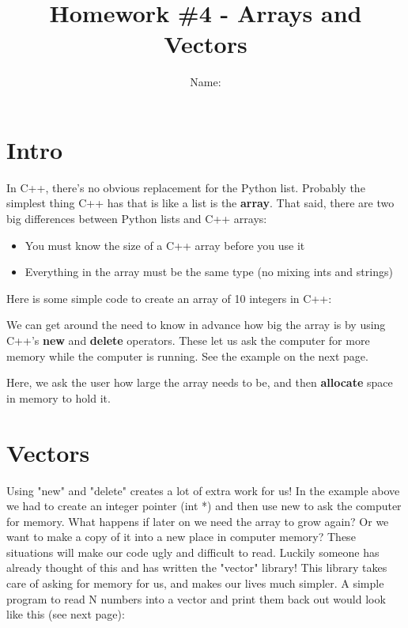 \documentclass[a4paper,12pt]{article} %
\title{\textbf{Homework \#4 - Arrays and Vectors}}
\author{Name: }
\date{} %
\begin{document}
\maketitle %

\section{Intro}

In C++, there's no obvious replacement for the Python list. Probably the simplest thing C++ has that is like a list is the \textbf{array}. That said, there are two big differences between Python lists and C++ arrays:

\begin{itemize}
\item You must know the size of a C++ array before you use it
\item Everything in the array must be the same type (no mixing ints and strings)
\end{itemize}

\noindent
Here is some simple code to create an array of 10 integers in C++:

\vspace{5mm}


\noindent
We can get around the need to know in advance how big the array is by using C++'s \textbf{new} and \textbf{delete} operators. These let us ask the computer for more memory while the computer is running. See the example on the next page.

\clearpage

\vspace{5mm}


\noindent
Here, we ask the user how large the array needs to be, and then \textbf{allocate} space in memory to hold it. 

\section{Vectors}

Using "new" and "delete" creates a lot of extra work for us! In the example above we had to create an integer pointer (int *) and then use new to ask the computer for memory. What happens if later on we need the array to grow again? Or we want to make a copy of it into a new place in computer memory? These situations will make our code ugly and difficult to read. Luckily someone has already thought of this and has written the "vector" library! This library takes care of asking for memory for us, and makes our lives much simpler. A simple program to read N numbers into a vector and print them back out would look like this (see next page):
\end{document}
